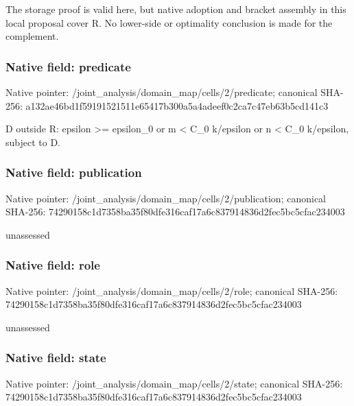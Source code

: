 \documentclass[10pt,a4paper]{article}
\begin{document}
\begingroup\raggedright\sloppy The storage proof is valid here,\allowbreak{} but native adoption and bracket assembly in this local proposal cover R. No lower-side or optimality conclusion is made for the complement.\par\endgroup

\subsubsection{Native field: predicate}
Native pointer: /joint\_\allowbreak{}analysis/domain\_\allowbreak{}map/cells/2/predicate; canonical SHA-256: a132ae46bd1f59191521511e65417b300a5a4adeef0c2ca7c47eb63b5cd141c3

\begingroup\raggedright\sloppy D outside R:\allowbreak{} epsilon >=\allowbreak{} epsilon\_\allowbreak{}0 or m < C\_\allowbreak{}0 k/\allowbreak{}epsilon or n < C\_\allowbreak{}0 k/\allowbreak{}epsilon,\allowbreak{} subject to D.\par\endgroup

\subsubsection{Native field: publication}
Native pointer: /joint\_\allowbreak{}analysis/domain\_\allowbreak{}map/cells/2/publication; canonical SHA-256: 74290158c1d7358ba35f80dfe316caf17a6c837914836d2fec5bc5cfac234003

\begingroup\raggedright\sloppy unassessed\par\endgroup

\subsubsection{Native field: role}
Native pointer: /joint\_\allowbreak{}analysis/domain\_\allowbreak{}map/cells/2/role; canonical SHA-256: 74290158c1d7358ba35f80dfe316caf17a6c837914836d2fec5bc5cfac234003

\begingroup\raggedright\sloppy unassessed\par\endgroup

\subsubsection{Native field: state}
Native pointer: /joint\_\allowbreak{}analysis/domain\_\allowbreak{}map/cells/2/state; canonical SHA-256: 74290158c1d7358ba35f80dfe316caf17a6c837914836d2fec5bc5cfac234003
\end{document}
